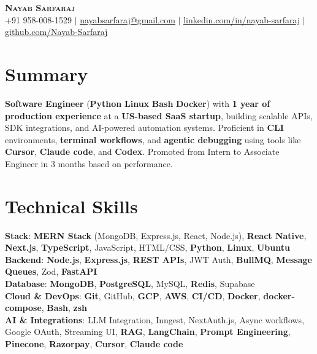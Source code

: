 \documentclass[letterpaper,11pt]{article}
\newcommand{\resumeItem}[1]{
  \item\small{
    {#1 \vspace{-2pt}}
  }
}
\newcommand{\resumeItemListStart}{\begin{itemize}}
\newcommand{\resumeItemListEnd}{\end{itemize}\vspace{-5pt}}
\begin{document}


\begin{center}
    \textbf{\Huge \scshape Nayab Sarfaraj} \\ \vspace{1pt}
    \small +91 958-008-1529 $|$ \href{nayabsarfaraj@gmail.com}{\underline{nayabsarfaraj@gmail.com}} $|$ 
    \href{https://www.linkedin.com/in/nayab-sarfaraj-856a70258/}{\underline{linkedin.com/in/nayab-sarfaraj}} $|$
    \href{https://github.com/Nayab-Sarfaraj}{\underline{github.com/Nayab-Sarfaraj}}
\end{center}



\section{Summary}
\resumeItem{\textbf{Software Engineer} (\textbf{Python} \cdot \textbf{Linux} \cdot \textbf{Bash} \cdot \textbf{Docker}) with \textbf{1 year of production experience} at a \textbf{US-based SaaS startup}, building scalable APIs, SDK integrations, and AI-powered automation systems. Proficient in \textbf{CLI} environments, \textbf{terminal workflows}, and \textbf{agentic debugging} using tools like \textbf{Cursor}, \textbf{Claude code}, and \textbf{Codex}. Promoted from Intern to Associate Engineer in 3 months based on performance.
}
\section{Technical Skills}
 \begin{itemize}[leftmargin=0.15in, label={}]
    \small{\item{
     \textbf{Stack}{: \textbf{MERN Stack} (MongoDB, Express.js, React, Node.js), \textbf{React Native}, \textbf{Next.js}, \textbf{TypeScript}, JavaScript, HTML/CSS, \textbf{Python}, \textbf{Linux}, \textbf{Ubuntu}} \\
     \textbf{Backend}{: \textbf{Node.js}, \textbf{Express.js}, \textbf{REST APIs}, JWT Auth, \textbf{BullMQ}, \textbf{Message Queues}, Zod, \textbf{FastAPI}} \\
     \textbf{Database}{: \textbf{MongoDB}, \textbf{PostgreSQL}, MySQL, \textbf{Redis}, Supabase}\\
     \textbf{Cloud \& DevOps}{: \textbf{Git}, GitHub, \textbf{GCP}, \textbf{AWS}, \textbf{CI/CD}, \textbf{Docker}, \textbf{docker-compose}, \textbf{Bash}, \textbf{zsh}}\\
     \textbf{AI \& Integrations}{: LLM Integration, Inngest, NextAuth.js, Async workflows, Google OAuth, Streaming UI, \textbf{RAG}, \textbf{LangChain}, \textbf{Prompt Engineering}, \textbf{Pinecone}, \textbf{Razorpay}, \textbf{Cursor}, \textbf{Claude code}}
    }}
 \end{itemize}
\end{document}
